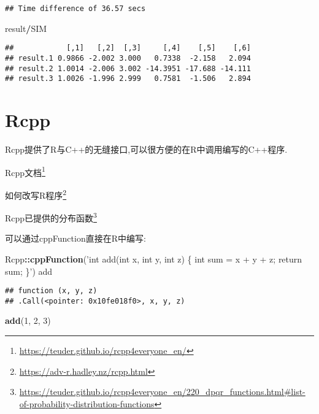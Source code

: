\documentclass[]{ctexbook}
\newenvironment{Shaded}{\begin{snugshade}}{\end{snugshade}}
\newcommand{\DecValTok}[1]{\textcolor[rgb]{0.00,0.00,0.81}{#1}}
\newcommand{\KeywordTok}[1]{\textcolor[rgb]{0.13,0.29,0.53}{\textbf{#1}}}
\newcommand{\NormalTok}[1]{#1}
\newcommand{\OperatorTok}[1]{\textcolor[rgb]{0.81,0.36,0.00}{\textbf{#1}}}
\newcommand{\StringTok}[1]{\textcolor[rgb]{0.31,0.60,0.02}{#1}}
\renewcommand{\href}[2]{#2\footnote{\url{#1}}}
\begin{document}
\begin{verbatim}
## Time difference of 36.57 secs
\end{verbatim}

\begin{Shaded}
\begin{Highlighting}[]
\NormalTok{result}\OperatorTok{/}\NormalTok{SIM}
\end{Highlighting}
\end{Shaded}

\begin{verbatim}
##            [,1]   [,2]  [,3]     [,4]    [,5]    [,6]
## result.1 0.9866 -2.002 3.000   0.7338  -2.158   2.094
## result.2 1.0014 -2.006 3.002 -14.3951 -17.688 -14.111
## result.3 1.0026 -1.996 2.999   0.7581  -1.506   2.894
\end{verbatim}

\hypertarget{rcpp}{%
\section{Rcpp}\label{rcpp}}

Rcpp提供了R与C++的无缝接口,可以很方便的在R中调用编写的C++程序.

\href{https://teuder.github.io/rcpp4everyone_en/}{Rcpp文档}

\href{https://adv-r.hadley.nz/rcpp.html}{如何改写R程序}

\href{https://teuder.github.io/rcpp4everyone_en/220_dpqr_functions.html\#list-of-probability-distribution-functions}{Rcpp已提供的分布函数}

可以通过cppFunction直接在R中编写:

\begin{Shaded}
\begin{Highlighting}[]
\NormalTok{Rcpp}\OperatorTok{::}\KeywordTok{cppFunction}\NormalTok{(}\StringTok{'int add(int x, int y, int z) \{}
\StringTok{  int sum = x + y + z;}
\StringTok{  return sum;}
\StringTok{\}'}\NormalTok{)}
\NormalTok{add}
\end{Highlighting}
\end{Shaded}

\begin{verbatim}
## function (x, y, z) 
## .Call(<pointer: 0x10fe018f0>, x, y, z)
\end{verbatim}

\begin{Shaded}
\begin{Highlighting}[]
\KeywordTok{add}\NormalTok{(}\DecValTok{1}\NormalTok{, }\DecValTok{2}\NormalTok{, }\DecValTok{3}\NormalTok{)}
\end{Highlighting}
\end{Shaded}
\end{document}
